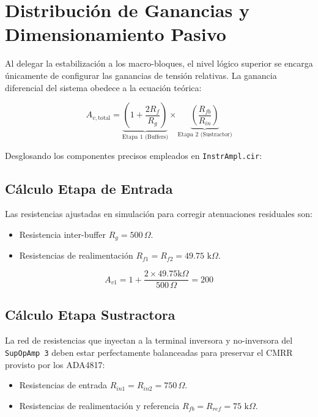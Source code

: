 \documentclass[11pt, a4paper]{article}
\begin{document}
\newpage
\section{Distribución de Ganancias y Dimensionamiento Pasivo}

Al delegar la estabilización a los macro-bloques, el nivel lógico superior se encarga únicamente de configurar las ganancias de tensión relativas. La ganancia diferencial del sistema obedece a la ecuación teórica:

\begin{equation}
A_{v,\text{total}} = \underbrace{\left( 1 + \frac{2 R_{f}}{R_g} \right)}_{\text{Etapa 1 (Buffers)}} \times \underbrace{\left( \frac{R_{fb}}{R_{in}} \right)}_{\text{Etapa 2 (Sustractor)}}
\end{equation}

Desglosando los componentes precisos empleados en \texttt{InstrAmpl.cir}:

\subsection{Cálculo Etapa de Entrada}
Las resistencias ajustadas en simulación para corregir atenuaciones residuales son:
\begin{itemize}
    \item Resistencia inter-buffer $R_g = 500\,\Omega$.
    \item Resistencias de realimentación $R_{f1} = R_{f2} = 49.75\text{ k}\Omega$.
\end{itemize}

\begin{equation}
A_{v1} = 1 + \frac{2 \times 49.75\text{k}\Omega}{500\,\Omega} = 200
\end{equation}

\subsection{Cálculo Etapa Sustractora}
La red de resistencias que inyectan a la terminal inversora y no-inversora del \texttt{SupOpAmp 3} deben estar perfectamente balanceadas para preservar el CMRR provisto por los ADA4817:
\begin{itemize}
    \item Resistencias de entrada $R_{in1} = R_{in2} = 750\,\Omega$.
    \item Resistencias de realimentación y referencia $R_{fb} = R_{ref} = 75\text{ k}\Omega$.
\end{itemize}
\end{document}
